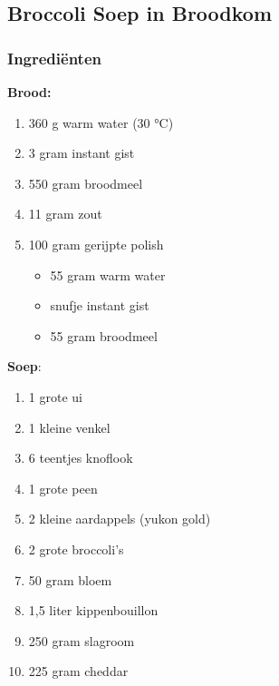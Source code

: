 \subsection{Broccoli Soep in Broodkom}
\subsubsection*{Ingrediënten}

\textbf{Brood:}

\begin{multicols}{2}
    \begin{enumerate}
        \item 360 g warm water (30 °C)
        \item 3 gram instant gist
        \item 550 gram broodmeel
        \item 11 gram zout
        \item 100 gram gerijpte polish
        \begin{itemize}
            \item 55 gram warm water
            \item snufje instant gist
            \item 55 gram broodmeel
        \end{itemize}        
    \end{enumerate}
\end{multicols}

\textbf{Soep}:

\begin{multicols}{2}
    \begin{enumerate}
        \item 1 grote ui
        \item 1 kleine venkel
        \item 6 teentjes knoflook
        \item 1 grote peen
        \item 2 kleine aardappels (yukon gold)
        \item 2 grote broccoli's
        \item 50 gram bloem
        \item 1,5 liter kippenbouillon
        \item 250 gram slagroom
        \item 225 gram cheddar
    \end{enumerate}
\end{multicols}

